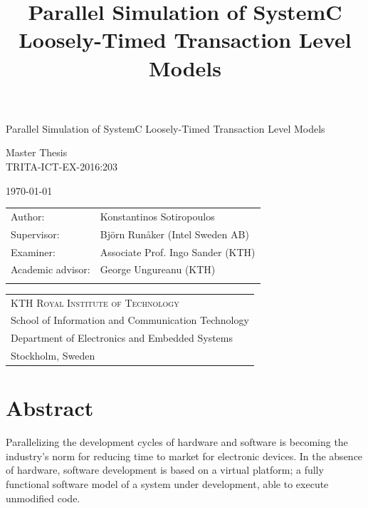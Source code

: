 \documentclass[11pt]{article}
\date{}
\title{Parallel Simulation of SystemC Loosely-Timed Transaction Level Models}
\begin{document}
\begin{titlepage}
\pagestyle{empty}
\begin{center}
  
  \vspace{5cm}
  
  \huge{Parallel Simulation of SystemC Loosely-Timed Transaction Level Models}
  \vspace{5cm} 
  
  \Large Master Thesis\\
  \small TRITA-ICT-EX-2016:203\\
  \vspace{2cm}
  
  \today
  \vspace{6cm}
  
  \begin{tabular}{ll} 
  \noindent Author: 	 		& Konstantinos Sotiropoulos \\
  \noindent Supervisor: 		& Björn Runåker (Intel Sweden AB) \\ 

  \noindent Examiner:  	 		& Associate Prof. Ingo Sander (KTH)\\ 
  \noindent Academic advisor: 	        & George Ungureanu (KTH) \\
  \noindent 
  \end{tabular}
  \vspace{2.5cm}

  \small
  \begin{tabular}{l}
  \textsc{KTH Royal Institute of Technology}\\
          School of Information and Communication Technology\\
          Department of Electronics and Embedded Systems\\
	  Stockholm, Sweden
  \end{tabular}
  
\end{center} 
\end{titlepage}
\clearpage

\section*{Abstract}
\label{sec:orgf4945c5}
\pagestyle{empty}

Parallelizing the development cycles of hardware and software is becoming the industry's norm for reducing time to market for electronic devices.
In the absence of hardware, software development is based on a virtual platform; 
a fully functional software model of a system under development, able to execute unmodified code.
\end{document}
